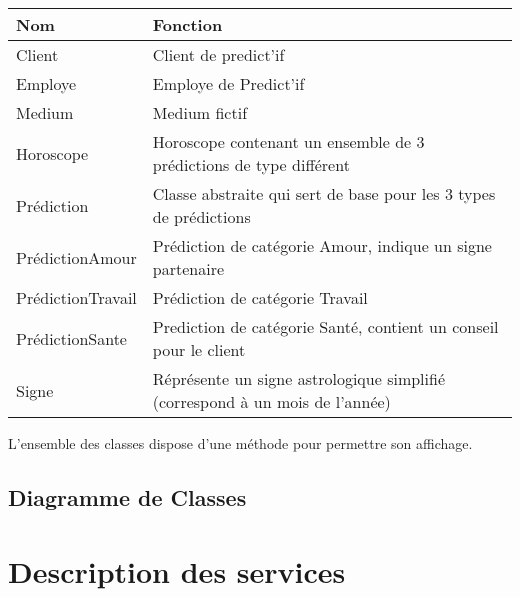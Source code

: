 \documentclass[a4paper,10pt,french]{sphinxmanual}
\begin{document}
\begin{tabulary}{\linewidth}{|L|L|}
\hline
\textsf{\relax 
Nom
} & \textsf{\relax 
Fonction
}\\
\hline
Client
 & 
Client de predict'if
\\
\hline
Employe
 & 
Employe de Predict'if
\\
\hline
Medium
 & 
Medium fictif
\\
\hline
Horoscope
 & 
Horoscope contenant un ensemble de 3 prédictions de type différent
\\
\hline
Prédiction
 & 
Classe abstraite qui sert de base pour les 3 types de prédictions
\\
\hline
PrédictionAmour
 & 
Prédiction de catégorie Amour,
indique un signe partenaire
\\
\hline
PrédictionTravail
 & 
Prédiction de catégorie Travail
\\
\hline
PrédictionSante
 & 
Prediction de catégorie Santé, contient un conseil pour le client
\\
\hline
Signe
 & 
Réprésente un signe astrologique simplifié
(correspond à un mois de l'année)
\\
\hline\end{tabulary}


L'ensemble des classes dispose d'une méthode  pour permettre son affichage.


\section{Diagramme de Classes}
\label{modele:diagramme-de-classes}

\chapter{Description des services}
\label{services:description-des-services}\label{services::doc}
\end{document}
